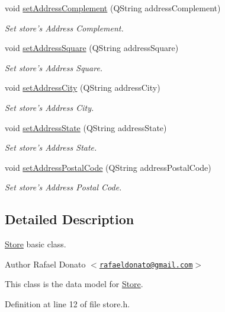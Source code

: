 \begin{DoxyCompactItemize}
void \hyperlink{class_store_ad2cb9244df8cf4ee3f7b9ab0a906b40f}{set\-Address\-Complement} (\-Q\-String address\-Complement)
\begin{DoxyCompactList}\small\item\em \-Set store's \-Address \-Complement. \end{DoxyCompactList}\item 
void \hyperlink{class_store_abc4879ce7b3d99e289a77d70181e469e}{set\-Address\-Square} (\-Q\-String address\-Square)
\begin{DoxyCompactList}\small\item\em \-Set store's \-Address \-Square. \end{DoxyCompactList}\item 
void \hyperlink{class_store_a119ba8cc8a0f770f0dfa36a4ffe6252d}{set\-Address\-City} (\-Q\-String address\-City)
\begin{DoxyCompactList}\small\item\em \-Set store's \-Address \-City. \end{DoxyCompactList}\item 
void \hyperlink{class_store_a2dccfd56a724a055c623f92bb5d1be71}{set\-Address\-State} (\-Q\-String address\-State)
\begin{DoxyCompactList}\small\item\em \-Set store's \-Address \-State. \end{DoxyCompactList}\item 
void \hyperlink{class_store_a330f83786d5d3752d32a2580705d4026}{set\-Address\-Postal\-Code} (\-Q\-String address\-Postal\-Code)
\begin{DoxyCompactList}\small\item\em \-Set store's \-Address \-Postal \-Code. \end{DoxyCompactList}\end{DoxyCompactItemize}


\subsection{\-Detailed \-Description}
\hyperlink{class_store}{\-Store} basic class. 

\begin{DoxyAuthor}{\-Author}
\-Rafael \-Donato $<$\href{mailto:rafaeldonato@gmail.com}{\tt rafaeldonato@gmail.\-com}$>$
\end{DoxyAuthor}
\-This class is the data model for \hyperlink{class_store}{\-Store}. 

\-Definition at line 12 of file store.\-h.



